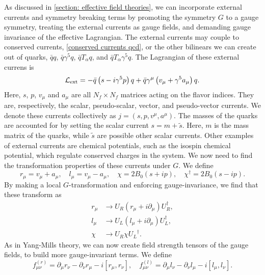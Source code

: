 As discussed in \autoref{section: effective field theories}, we can incorporate external currents and symmetry breaking terms by promoting the symmetry $G$ to a gauge symmetry, treating the external currents as gauge fields, and demanding gauge invariance of the effective Lagrangian.
The external currents may couple to conserved currents, \autoref{conserved currents qcd}, or the other bilinears we can create out of quarks, $\bar q q$, $\bar q\gamma^5 q$, $\bar q T_\alpha q$, and $\bar q T_\alpha \gamma^5 q$.
The Lagrangian of these external currens is
%
\begin{align}
    \mathcal{L}_{\text{ext}}
    = - \bar q \left(s - i \gamma^5 p \right) q
    + \bar q \gamma^\mu  \left(v_\mu + \gamma^5 a_\mu\right)q.
\end{align}
%
Here, $s$, $p$, $v_\mu$ and $a_\mu$ are all $N_f\times N_f$ matrices acting on the flavor indices.
They are, respectively, the scalar, pseudo-scalar, vector, and pseudo-vector currents.
We denote these currents collectively as $j = (s, p, v^\mu, a^\mu)$.
The masses of the quarks are accounted for by setting the scalar current $s = m + \tilde s$.
Here, $m$ is the mass matrix of the quarks, while $\tilde s$ are possible other scalar currents.
Other examples of external currents are chemical potentials, such as the isospin chemical potential, which regulate conserved charges in the system.
We now need to find the transformation properties of these currents under $G$.
We define
%
\begin{equation}
    r_\mu = v_\mu + a_\mu, \quad l_\mu = v_\mu - a_\mu, \quad  
    \chi = 2 B_0 (s +ip), \quad
    \chi^\dagger = 2 B_0(s - ip).
\end{equation}
%
By making a local $G$-transformation and enforcing gauge-invariance, we find that these transform as
%
\begin{align}
    r_\mu &\rightarrow U_R (r_\mu + i\partial_\mu) U_R^\dagger, \\
    l_\mu &\rightarrow U_L (l_\mu + i\partial_\mu) U_L^\dagger, \\
    \chi &\rightarrow U_R \chi {U_L}^\dagger.
\end{align}
%
As in Yang-Mills theory, we can now create field strength tensors of the gauge fields, to build more gauge-invariant terms.
We define
%
\begin{equation}
    f_{\mu \nu}^{(r)} 
    = 
    \partial_\mu r_\nu - \partial_\nu r_\mu - i[r_\mu, r_\nu], 
    \quad f_{\mu \nu}^{(l)} 
    = \partial_\mu l_\nu - \partial_\nu l_\mu - i[l_\mu, l_\nu].
\end{equation}
